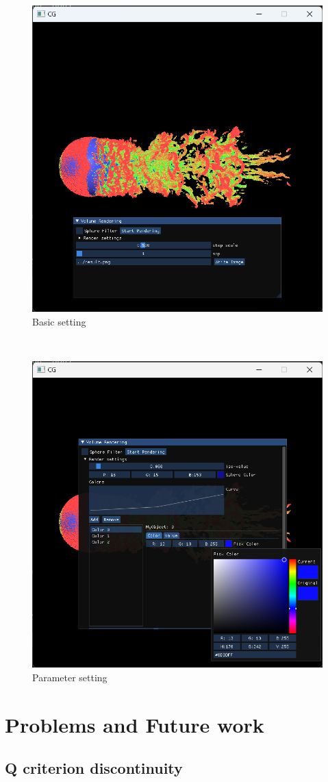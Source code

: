 \documentclass[acmtog]{acmart}
\begin{document}
\begin{figure}[h]
	\centering
	\includegraphics[width = 0.68\linewidth]{images/ui1.png}
	\caption{Basic setting}
\end{figure}
\ \\
\begin{figure}[H]
	\centering
	\includegraphics[width = 0.68\linewidth]{images/ui2.png}
	\caption{Parameter setting}
\end{figure}


\section{Problems and Future work}


\subsection{Q criterion discontinuity}
\end{document}
